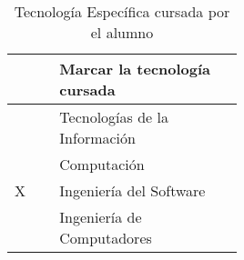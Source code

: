 \documentclass{pre-tfg}
\begin{document}
    \begin{table}[hp]
        \centering
        \caption{Tecnología Específica cursada por el alumno}
        \label{tab:tec-especifica}

        \begin{tabular}{p{0.1\linewidth}p{0.4\linewidth}}
            & \textbf{Marcar la tecnología cursada} \\
            \hline
            & Tecnologías de la Información \\
            & Computación \\
            X & Ingeniería del Software \\
            & Ingeniería de Computadores \\
            \hline
        \end{tabular}
    \end{table}


\end{document}
